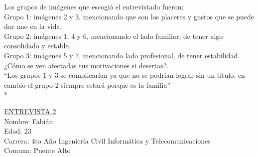 Los grupos de imágenes que escogió el entrevistado fueron:\\

Grupo 1: imágenes 2 y 3, mencionando que son los placeres y gustos que se puede dar uno en la vida.\\

Grupo 2: imágenes 1, 4 y 6, mencionando el lado familiar, de tener algo consolidado y estable.\\

Grupo 3: imágenes 5 y 7, mencionando lado profesional, de tener estabilidad.\\

¿Cómo se ven afectadas tus motivaciones si desertas?.\\
``Los grupos 1 y 3 se complicarían ya que no se podrían lograr sin un título, en cambio el grupo 2 siempre estará porque es la familia''\\* 


\underline {ENTREVISTA 2} \\
Nombre: Fabián\\
Edad: 23\\
Carrera: 4to Año Ingeniería Civil Informática y Telecomunicaciones\\
Comuna: Puente Alto \\

